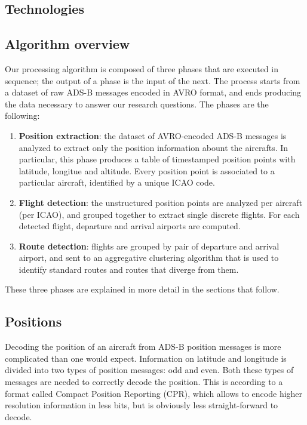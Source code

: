 \documentclass{vldb}
\begin{document}
\subsection{Technologies}

\subsection{Algorithm overview}

Our processing algorithm is composed of three phases that are executed in
sequence; the output of a phase is the input of the next. The process starts
from a dataset of raw ADS-B messages encoded in AVRO format, and ends producing
the data necessary to answer our research questions. The phases are the
following:

\begin{enumerate}
  \item \textbf{Position extraction}: the dataset of AVRO-encoded ADS-B messages
  is analyzed to extract only the position information abount the aircrafts. In
  particular, this phase produces a table of timestamped position points with
  latitude, longitue and altitude. Every position point is associated to a
  particular aircraft, identified by a unique ICAO code.
  \item \textbf{Flight detection}: the unstructured position points are analyzed
  per aircraft (per ICAO), and grouped together to extract single discrete
  flights. For each detected flight, departure and arrival airports are
  computed.
  \item \textbf{Route detection}: flights are grouped by pair of departure and
  arrival airport, and sent to an aggregative clustering algorithm that is used
  to identify standard routes and routes that diverge from them.
\end{enumerate}

These three phases are explained in more detail in the sections that follow.

\subsection{Positions}

Decoding the position of an aircraft from ADS-B position messages is more
complicated than one would expect. Information on latitude and longitude is
divided into two types of position messages: odd and even. Both these types of
messages are needed to correctly decode the position. This is according to a
format called Compact Position Reporting (CPR), which allows to encode higher
resolution information in less bits, but is obviously less straight-forward to
decode.
\end{document}

